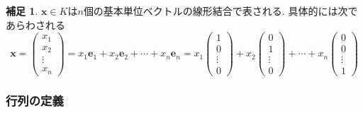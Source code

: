 \documentclass[dvipdfmx,a4paper,11pt]{article} %
\theoremstyle{definition}
\newtheorem{rem}[thm]{補足}
\begin{document}
\begin{rem}
$\bm{x} \in K$は$n$個の基本単位ベクトルの線形結合で表される. 具体的には次であらわされる
$$
\bm{x}
=
\begin{pmatrix}
x_1\\x_2\\\vdots\\x_n
\end{pmatrix}
=
x_1 \bm{e}_1 + x_2 \bm{e}_2 + \cdots + x_n\bm{e}_n 
=
x_1 \begin{pmatrix}
1\\0\\\vdots\\0
\end{pmatrix} + x_2 \begin{pmatrix}
0\\1\\\vdots\\0
\end{pmatrix} + \cdots + x_n\begin{pmatrix}
0\\0\\\vdots\\1
\end{pmatrix} 
$$
\end{rem}


\subsubsection{行列の定義}
\end{document}

